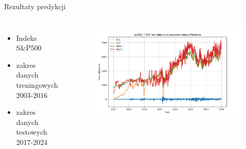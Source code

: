 \begin{frame}{Rezultaty predykcji}
    \begin{columns}[t]
            \begin{itemize}
                \item Indeks S\&P500
                \item zakres danych treningowych 2003-2016
                \item zakres danych testowych 2017-2024
            \end{itemize}
        \centering
        \begin{figure}
            \centering
            \includegraphics[width=1\textwidth]{images/prediction_error.png}
        \end{figure}    
    \end{columns}
\end{frame}
